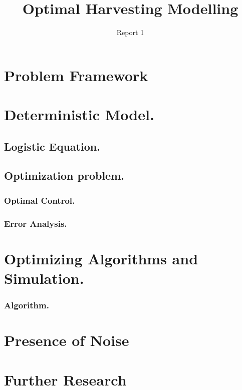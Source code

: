\documentclass[twoside,colorback,accentcolor=tud4c,11pt]{tudreport}
\title{Optimal Harvesting Modelling}
\subtitle{Report 1}
\begin{document}
\maketitle
\begin{abstract}

\end{abstract}  

\tableofcontents

\chapter{Problem Framework}\label{chap:Problem Framework}

\chapter{Deterministic Model.} \label{chap: Deterministic Model}
\section{Logistic Equation.}
\section{Optimization problem.}

\subsection{Optimal Control.}
\subsection{Error Analysis.}
\chapter{Optimizing Algorithms and Simulation.}
\subsection{Algorithm.}
\subsection{}
\chapter{Presence of Noise}\label{chap: Population Functional}

\chapter{Further Research}\label{chap: Further Enhancements}
\end{document}
